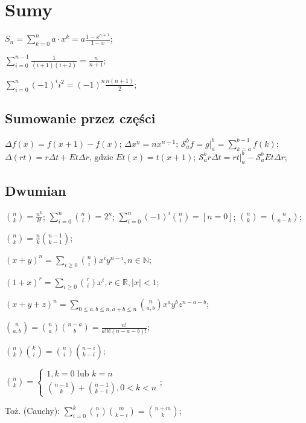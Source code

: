 \section{Sumy}

${S_n = \sum^{n}_{k = 0} a \cdot x^k} = {a \frac{1 - x^{n+1}}{1 - x}}$;

$\sum_{i=0}^{n-1}\frac{1}{(i+1)(i+2)} = \frac{n}{n+1}$;

$\sum_{i=0}^{n}(-1)^i i^2 = (-1)^n\frac{n(n+1)}{2}$;

\subsection{Sumowanie przez części}

${\Delta f(x) = f(x + 1) - f(x)}$;
${\Delta x^{\underline{n}}} = {n x^{\underline{n - 1}}}$;
${\mathcal{S}^{b}_{a} f}={g |^b_a} = {\sum^{b - 1}_{k = a} f(k)}$;
${\Delta (rt)} = {r \Delta t + E t \Delta r \text{, gdzie } E t(x)} =
  {t(x + 1)}$;
${\mathcal{S}^{b}_{a} r \Delta t}= {r t |^b_a - \mathcal{S}^b_a E t \Delta r}$;

\subsection{Dwumian}

${\binom{n}{k} = {\frac{n^{\underline{k}}}{k!}}}$;
${\sum_{i = 0}^n \binom{n}{i} = 2^n}$;
${\sum_{i = 0}^{n} (-1)^i \binom{n}{i} = [ n = 0 ]}$;
$\binom{n}{k} = \binom{n}{n - k}$;

$\binom{n}{k} = \frac{n}{k} \binom{n - 1}{k - 1}$;

${(x + y)^n = \sum_{i \geq 0} \binom{n}{i} x^i y^{n-i}, n \in \mathbb{N}}$;

${(1 + x)^r = \sum_{i \geq 0} \binom{r}{i} x^i, r \in \mathbb{R}, |x| < 1}$;

$(x + y + z)^n =
  \sum_{0 \leq a, b \leq n, a+b \leq n} \binom{n}{a,b} x^a y^b z^{n-a-b}$;

$\binom{n}{a,b} = \binom{n}{a}\binom{n-a}{b} = \frac{n!}{a! b! (n - a - b)!}$;

$\binom{n}{k}\binom{k}{i} = \binom{n}{i}\binom{n-i}{k-i}$;

$\binom{n}{k} = \begin{cases}
    1, k = 0 \text{ lub } k = n \\
    \binom{n - 1}{k} + \binom{n - 1}{k - 1}, 0 < k < n
\end{cases}
$;

Toż. (Cauchy): $\sum^k_{i=0}\binom{n}{i}\binom{m}{k - i} = \binom{n + m}{k}$;

